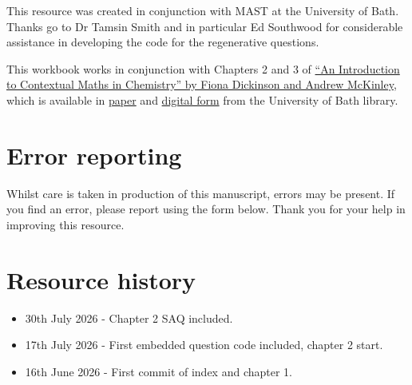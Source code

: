 \documentclass[
  letterpaper,
  DIV=11,
  numbers=noendperiod]{scrreprt}
\providecommand{\tightlist}{%
  \setlength{\itemsep}{0pt}\setlength{\parskip}{0pt}}
\begin{document}

This resource was created in conjunction with MAST at the University of
Bath. Thanks go to Dr Tamsin Smith and in particular Ed Southwood for
considerable assistance in developing the code for the regenerative
questions.

This workbook works in conjunction with Chapters 2 and 3 of
\href{https://books.rsc.org/books/monograph/1959/Introduction-to-Contextual-Maths-in-Chemistry}{``An
Introduction to Contextual Maths in Chemistry'' by Fiona Dickinson and
Andrew McKinley}, which is available in
\href{https://bath.primo.exlibrisgroup.com/discovery/fulldisplay?docid=alma991003768059702761&context=L&vid=44BAT_INST:44BAT_VU1&lang=en&search_scope=MyInst_and_CI&adaptor=Local\%20Search\%20Engine&isFrbr=true&tab=Everything&query=any,contains,maths\%20dickinson&sortby=date_d&facet=frbrgroupid,include,9045141419038150349&offset=0}{paper}
and
\href{https://bath.primo.exlibrisgroup.com/discovery/fulldisplay?docid=alma991003857104302761&context=L&vid=44BAT_INST:44BAT_VU1&lang=en&search_scope=MyInst_and_CI&adaptor=Local\%20Search\%20Engine&isFrbr=true&tab=Everything&query=any,contains,maths\%20dickinson&sortby=date_d&facet=frbrgroupid,include,9045141419038150349&offset=0}{digital
form} from the University of Bath library.

\section*{Error reporting}\label{error-reporting}


Whilst care is taken in production of this manuscript, errors may be
present. If you find an error, please report using the form below. Thank
you for your help in improving this resource.

\section*{Resource history}\label{resource-history}


\begin{itemize}
\tightlist
\item
  30th July 2026 - Chapter 2 SAQ included.
\item
  17th July 2026 - First embedded question code included, chapter 2
  start.
\item
  16th June 2026 - First commit of index and chapter 1.
\end{itemize}
\end{document}
